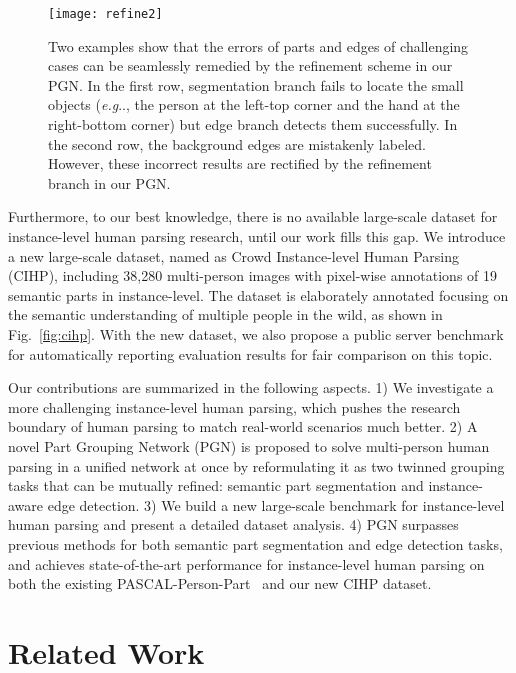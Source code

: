 \documentclass[runningheads]{llncs}
\makeatletter
\DeclareRobustCommand\onedot{\futurelet\@let@token\@onedot}
\def\@onedot{\ifx\@let@token.\else.\null\fi\xspace}
\def\eg{\emph{e.g}\onedot} \def\Eg{\emph{E.g}\onedot}
\makeatother
\begin{document}
\begin{figure}[t]
\begin{center}
   \texttt{[image: refine2]}
\end{center}
\vspace{-6mm}
\caption{Two examples show that the errors of parts and edges of challenging cases can be seamlessly remedied by the refinement scheme in our PGN. In the first row, segmentation branch fails to locate the small objects (\eg, the person at the left-top corner and the hand at the right-bottom corner) but edge branch detects them successfully. In the second row, the background edges are mistakenly labeled. However, these incorrect results are rectified by the refinement branch in our PGN.}
\vspace{-6mm}
\label{fig:refined}
\end{figure}


Furthermore, to our best knowledge, there is no available large-scale dataset for instance-level human parsing research, until our work fills this gap. We introduce a new large-scale dataset, named as Crowd Instance-level Human Parsing (CIHP), including 38,280 multi-person images with pixel-wise annotations of 19 semantic parts in instance-level. The dataset is elaborately annotated focusing on the semantic understanding of multiple people in the wild, as shown in Fig.~\ref{fig:cihp}. With the new dataset, we also propose a public server benchmark for automatically reporting evaluation results for fair comparison on this topic.

Our contributions are summarized in the following aspects. 1) We investigate a more challenging instance-level human parsing, which pushes the research boundary of human parsing to match real-world scenarios much better. 2) A novel Part Grouping Network (PGN) is proposed to solve multi-person human parsing in a unified network at once by reformulating it as two twinned grouping tasks that can be mutually refined: semantic part segmentation and instance-aware edge detection. 3) We build a new large-scale benchmark for instance-level human parsing and present a detailed dataset analysis. 4) PGN surpasses previous methods for both semantic part segmentation and edge detection tasks, and achieves state-of-the-art performance for instance-level human parsing on both the existing PASCAL-Person-Part~\cite{chen2014detect} and our new CIHP dataset.



\section{Related Work}
\end{document}

